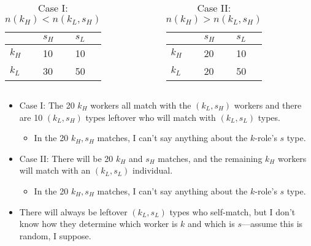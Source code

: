 \documentclass[aspectratio=169]{beamer}
\begin{document}
\begin{frame}
	    \begin{columns}
		\begin{column}{0.4\textwidth}
			\begin{table}
		\begin{tabular}{l|ll}
	& $s_H$ & $s_L$ \\ \hline
	$k_H$ & 10    & 10    \\
	$k_L$ & 30    & 50   
\end{tabular}
				\caption*{Case I: $n(k_H) < n(k_L,s_H)$}
			\end{table}
		\end{column}
		\begin{column}{0.4\textwidth}
			\begin{table}
		\begin{tabular}{l|ll}
	& $s_H$ & $s_L$ \\ \hline
	$k_H$ & 20    & 10    \\
	$k_L$ & 20    & 50 
\end{tabular}
\caption*{Case II: $n(k_H) > n(k_L,s_H)$}
			\end{table}
		\end{column}
	\end{columns}
		\begin{itemize}
		\item Case I: The 20 $k_H$ workers all match with the $(k_L,s_H)$ workers and there are 10 $(k_L,s_H)$ types leftover who will match with $(k_L,s_L)$ types. 
		\begin{itemize}
			\item In the 20 $k_H,s_H$ matches, I can't say anything about the $k$-role's $s$ type.
		\end{itemize}
		\smallskip
		\item Case II: There will be 20 $k_H$ and $s_H$ matches, and the remaining $k_H$ workers will match with an $(k_L,s_L)$ individual.
		\begin{itemize}
			\item In the 20 $k_H,s_H$ matches, I can't say anything about the $k$-role's $s$ type.
		\end{itemize}
		\smallskip
		\item There will always be leftover $(k_L,s_L)$ types who self-match, but I don't know how they determine which worker is $k$ and which is $s$---assume this is random, I suppose.
	\end{itemize}
\end{frame}
\end{document}
